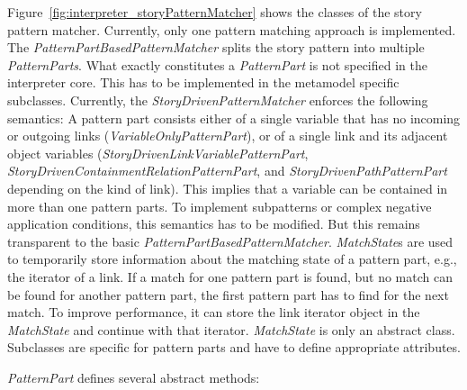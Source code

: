 Figure~\ref{fig:interpreter_storyPatternMatcher} shows the classes of the story pattern matcher. 
Currently, only one pattern matching approach is implemented. 
The \emph{PatternPartBasedPatternMatcher} splits the story pattern into multiple \emph{PatternParts}. 
What exactly constitutes a \emph{PatternPart} is not specified in the interpreter core. 
This has to be implemented in the metamodel specific subclasses. 
Currently, the \emph{StoryDrivenPatternMatcher} enforces the following semantics: A pattern part consists either of a single variable that has no incoming or outgoing links (\emph{VariableOnlyPatternPart}), or of a single link and its adjacent object variables (\emph{StoryDrivenLinkVariablePatternPart}, \emph{StoryDrivenContainmentRelationPatternPart}, and \emph{StoryDrivenPathPatternPart} depending on the kind of link). 
This implies that a variable can be contained in more than one pattern parts. 
To implement subpatterns or complex negative application conditions, this semantics has to be modified. 
But this remains transparent to the basic \emph{PatternPartBasedPatternMatcher}.
\emph{MatchState}s are used to temporarily store information about the matching state of a pattern part, e.g., the iterator of a link.
If a match for one pattern part is found, but no match can be found for another pattern part, the first pattern part has to find for the next match.
To improve performance, it can store the link iterator object in the \emph{MatchState} and continue with that iterator.
\emph{MatchState} is only an abstract class.
Subclasses are specific for pattern parts and have to define appropriate attributes.

\emph{PatternPart} defines several abstract methods:

